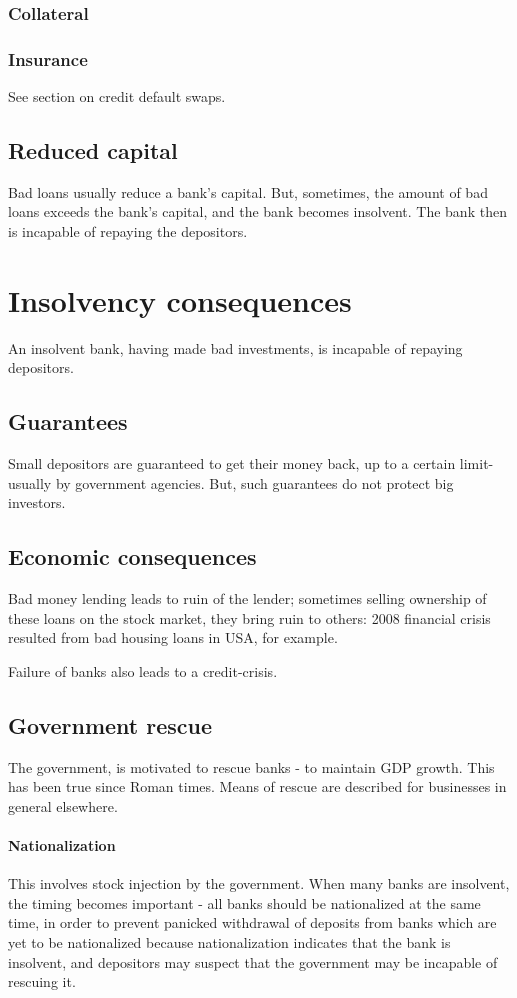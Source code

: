 \documentclass[oneside, article]{memoir}
\begin{document}
\subsubsection{Collateral}
\tbc

\subsubsection{Insurance}
See section on credit default swaps.

\subsection{Reduced capital}
Bad loans usually reduce a bank's capital. But, sometimes, the amount of bad loans exceeds the bank's capital, and the bank becomes insolvent. The bank then is incapable of repaying the depositors.

\section{Insolvency consequences}
An insolvent bank, having made bad investments, is incapable of repaying depositors.

\subsection{Guarantees}
Small depositors are guaranteed to get their money back, up to a certain limit- usually by government agencies.  But, such guarantees do not protect big investors.

\subsection{Economic consequences}
Bad money lending leads to ruin of the lender; sometimes selling ownership of these loans on the stock market, they bring ruin to others: 2008 financial crisis resulted from bad housing loans in USA, for example.

Failure of banks also leads to a credit-crisis.

\subsection{Government rescue}
The government, is motivated to rescue banks - to maintain GDP growth. This has been true since Roman times. Means of rescue are described for businesses in general elsewhere.

\paragraph{Nationalization}
This involves stock injection by the government. When many banks are insolvent, the timing becomes important - all banks should be nationalized at the same time, in order to prevent panicked withdrawal of deposits from banks which are yet to be nationalized because nationalization indicates that the bank is insolvent, and depositors may suspect that the government may be incapable of rescuing it.
\end{document}
